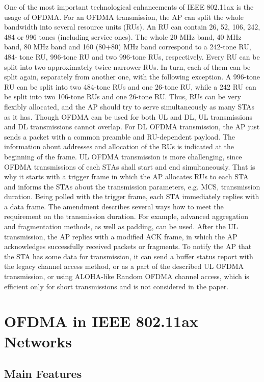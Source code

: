 One of the most important technological enhancements of
IEEE 802.11ax is the usage of OFDMA. 
For an OFDMA transmission, the AP can split the whole
bandwidth into several resource units (RUs). An RU can
contain 26, 52, 106, 242, 484 or 996 tones (including service
ones). The whole 20 MHz band, 40 MHz band, 80 MHz band
and 160 (80+80) MHz band correspond to a 242-tone RU, 484-
tone RU, 996-tone RU and two 996-tone RUs, respectively.
Every RU can be split into two approximately twice-narrower
RUs. In turn, each of them can be split again, separately from
another one, with the following exception. A 996-tone RU can
be split into two 484-tone RUs and one 26-tone RU, while a
242 RU can be split into two 106-tone RUs and one 26-tone
RU. Thus, RUs can be very flexibly allocated, and the AP
should try to serve simultaneously as many STAs as it has.
Though OFDMA can be used for both UL and DL, UL
transmissions and DL transmissions cannot overlap.
For DL OFDMA transmission, the AP just sends a packet
with a common preamble and RU-dependent payload. The
information about addresses and allocation of the RUs is
indicated at the beginning of the frame.
UL OFDMA transmission is more challenging, since
OFDMA transmissions of each STAs shall start and end
simultaneously. That is why it starts with a trigger frame in
which the AP allocates RUs to each STA and informs the
STAs about the transmission parameters, e.g. MCS, transmission
duration. Being polled with the trigger frame, each
STA immediately replies with a data frame. The amendment
describes several ways how to meet the requirement on the
transmission duration. For example, advanced aggregation and
fragmentation methods, as well as padding, can be used. After
the UL transmission, the AP replies with a modified ACK
frame, in which the AP acknowledges successfully received
packets or fragments. To notify the AP that the STA has
some data for transmission, it can send a buffer status report
with the legacy channel access method, or as a part of the
described UL OFDMA transmission, or using ALOHA-like
Random OFDMA channel access, which is efficient only for
short transmissions and is not considered in the paper.

\section{OFDMA in IEEE 802.11ax Networks}
\label{sec:ofdma}
\subsection{Main Features}
\label{mainfeatures}

